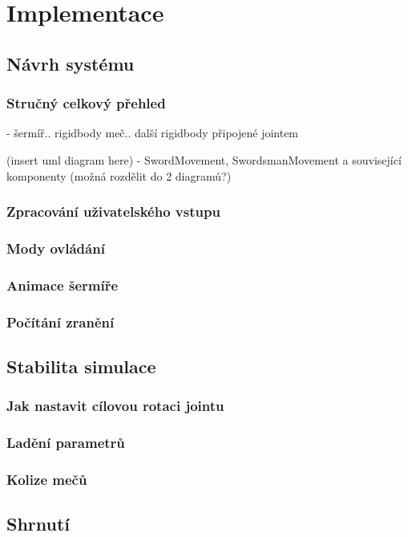 \chapter{Implementace}

\section{Návrh systému}

\subsection{Stručný celkový přehled}

- šermíř.. rigidbody
  meč.. další rigidbody připojené jointem

(insert uml diagram here)
- SwordMovement, SwordsmanMovement a související komponenty (možná rozdělit do 2 diagramů?)


\subsection{Zpracování uživatelského vstupu}

\subsection{Mody ovládání}

\subsection{Animace šermíře}

\subsection{Počítání zranění}


\section{Stabilita simulace}

\subsection{Jak nastavit cílovou rotaci jointu}

\subsection{Ladění parametrů}

\subsection{Kolize mečů}


\section{Shrnutí}
